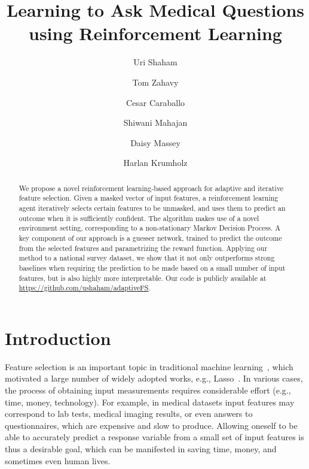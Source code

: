 \documentclass[reqno,11pt]{article}
\title{Learning to Ask Medical Questions using Reinforcement Learning}
\author[1]{Uri Shaham}
\author[2]{Tom Zahavy}
\author[1]{Cesar Caraballo}
\author[1]{Shiwani Mahajan}
\author[1]{Daisy Massey}
\author[1]{Harlan Krumholz}
\affil[1]{Center for Outcomes Research and Evaluation, Yale University}
\affil[2]{Department of Electrical Engineering, Technion}
\date{}                                           %
\begin{document}
\maketitle

\begin{abstract} 
We propose a novel  reinforcement learning-based approach for adaptive and iterative feature selection.
Given a masked vector of input features, a reinforcement learning agent iteratively selects certain features to be unmasked, and uses them to predict an outcome when it is sufficiently confident. 
The algorithm makes use of a novel environment setting, corresponding to a non-stationary Markov Decision Process. A key component of our approach is a guesser network, trained to predict the outcome from the selected features and parametrizing the reward function.
Applying  our method to a national survey dataset, we show that it not only outperforms strong baselines when requiring the prediction to  be made based on a small number of input features, but is also highly more interpretable. Our code is publicly available at \url{https://github.com/ushaham/adaptiveFS}.

\end{abstract} 

\section {Introduction}\label{sec:intro}
Feature selection is an important topic in traditional machine learning~\citep{li2018feature}, which motivated a large number of widely adopted works, e.g., Lasso~\citep{tibshirani1996regression}.
In various cases, the process of obtaining input measurements requires considerable effort (e.g., time, money, technology). 
For example, in medical datasets input features may correspond to lab tests, medical imaging results, or even answers to questionnaires, which are expensive and slow to produce.
Allowing oneself to be able to accurately predict a response variable from a small set of input features is thus a desirable goal, which can be manifested in saving time, money, and sometimes even human lives.
\end{document}
